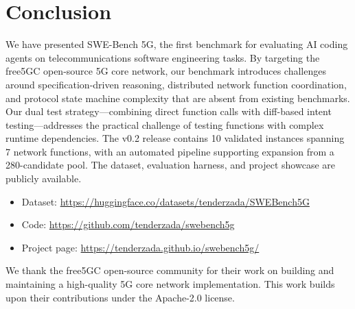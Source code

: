 \documentclass{article}
\begin{document}
\section{Conclusion}

We have presented SWE-Bench 5G, the first benchmark for evaluating AI coding agents on telecommunications software engineering tasks. By targeting the free5GC open-source 5G core network, our benchmark introduces challenges around specification-driven reasoning, distributed network function coordination, and protocol state machine complexity that are absent from existing benchmarks. Our dual test strategy---combining direct function calls with diff-based intent testing---addresses the practical challenge of testing functions with complex runtime dependencies. The v0.2 release contains 10 validated instances spanning 7 network functions, with an automated pipeline supporting expansion from a 280-candidate pool. The dataset, evaluation harness, and project showcase are publicly available.

\begin{itemize}
    \item Dataset: \url{https://huggingface.co/datasets/tenderzada/SWEBench5G}
    \item Code: \url{https://github.com/tenderzada/swebench5g}
    \item Project page: \url{https://tenderzada.github.io/swebench5g/}
\end{itemize}

\begin{ack}
We thank the free5GC open-source community for their work on building and maintaining a high-quality 5G core network implementation. This work builds upon their contributions under the Apache-2.0 license.
\end{ack}



\end{document}
